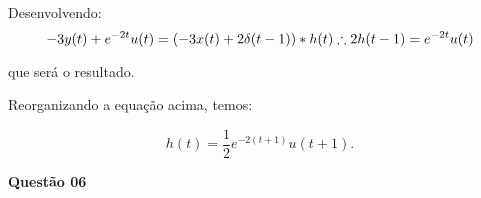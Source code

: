 Desenvolvendo:
\begin{equation}
    -3y(t) + e^{-2t}u(t) = (-3x(t) + 2\delta(t-1))*h(t) \therefore \\ 2h(t-1) = e^{-2t}u(t)
\end{equation}



que será o resultado. 

Reorganizando a equação acima, temos:

\begin{equation}
    h(t) = \frac{1}{2}e^{-2(t+1)}u(t+1).
\end{equation}

\newpage
\textbf{Questão 06}



